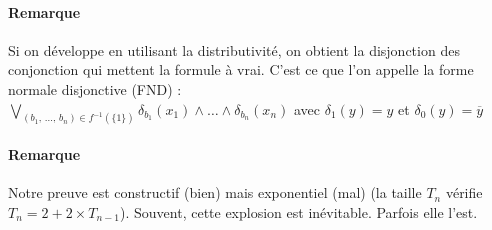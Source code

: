 \paragraph{Remarque}
	Si on développe en utilisant la distributivité, on obtient la disjonction des conjonction qui mettent la formule à vrai. C'est ce que l'on appelle la forme normale disjonctive (FND) : \\
	$\bigvee\limits_{\left(b_1, \,\dots, \, b_n\right) \in f^{-1}(\{1\})} \delta_{b_1}(x_1) \wedge \dots \wedge \delta_{b_n}(x_n) $ avec $\delta_1(y) = y$ et $\delta_0(y) = \overline y$

%		
%	
%	

\paragraph{Remarque} Notre preuve est constructif (bien) mais exponentiel (mal) (la taille $T_n$ vérifie $T_n = 2 + 2\times T_{n-1}$). Souvent, cette explosion est inévitable. Parfois elle l'est.

